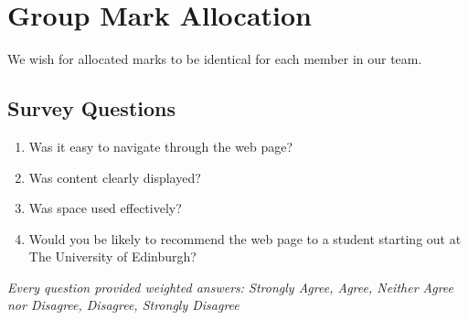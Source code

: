 \documentclass[a4paper, notoc]{tufte-handout}
\begin{document}
\section*{Group Mark Allocation}\label{group-mark-allocation}


We wish for allocated marks to be identical for each member in our team.

\newpage

\begin{appendix}
\section{Survey Questions}
\begin{enumerate}
\item Was it easy to navigate through the web page?
\item Was content clearly displayed?
\item Was space used effectively?
\item Would you be likely to recommend the web page to a student starting out at The University of Edinburgh?
\end{enumerate}

\textit{Every question provided weighted answers: Strongly Agree, Agree, Neither Agree nor Disagree, Disagree, Strongly Disagree}
\end{appendix}
\end{document}
